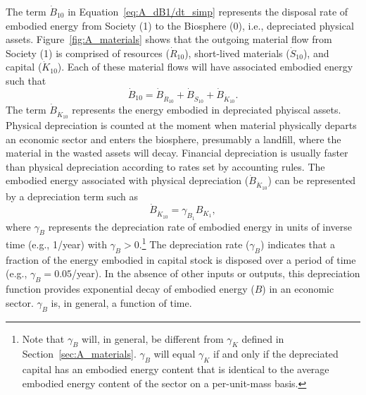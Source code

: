 The term $\dot{B}_{10}$ in Equation~\ref{eq:A_dB1/dt_simp}
represents the disposal rate 
of embodied energy from Society (1) to the Biosphere (0),
i.e., depreciated physical assets. 
Figure~\ref{fig:A_materials} shows that the outgoing material flow
from Society (1) is comprised of 
resources ($\dot{R}_{10}$),
short-lived materials ($\dot{S}_{10}$), and 
capital ($\dot{K}_{10}$). 
Each of these material flows will have associated embodied energy such that
%
\begin{equation} \label{eq:A-depreciation-of-B}
	\dot{B}_{10}
	= \dot{B}_{\dot{R}_{10}}
	+ \dot{B}_{\dot{S}_{10}}
	+ \dot{B}_{\dot{K}_{10}}.
\end{equation}
%
The term $\dot{B}_{\dot{K}_{10}}$ represents the energy embodied
in depreciated phyiscal assets.
Physical depreciation
is counted at the moment when material physically departs an economic sector 
and enters the biosphere, presumably a landfill, 
where the material in the wasted assets will decay.
Financial depreciation
is usually faster than physical depreciation
according to rates set by accounting rules.
The embodied energy associated with physical depreciation ($\dot{B}_{\dot{K}_{10}}$)
can be represented by a depreciation term such as
%
\begin{equation} \label{eq:depreciation_term_defined}
	\dot{B}_{\dot{K}_{10}} 
	= \gamma_{B_{1}} B_{K_{1}},
\end{equation}
%
where $\gamma_{B}$ represents the depreciation rate 
of embodied energy in units of inverse time (e.g., 1/year) 
with $\gamma_{B} > 0$.\footnote{Note that $\gamma_B$ will, in general,
	be different from $\gamma_{K}$ defined in Section~\ref{sec:A_materials}.
	$\gamma_{B}$ will equal $\gamma_{K}$ if and only if 
	the depreciated capital has an embodied energy content that is 
	identical to the average embodied energy content 
	of the sector on a per-unit-mass basis.}
The depreciation rate ($\gamma_{B}$) indicates that 
a fraction of the energy embodied in capital stock
is disposed over a period of time (e.g., $\gamma_{B} = 0.05$/year). 
In the absence of other inputs or outputs, 
this depreciation function provides exponential decay 
of embodied energy ($B$) in an economic sector. 
$\gamma_{B}$ is, in general, a function of time.

